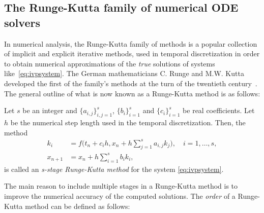 \subsection{The Runge-Kutta family of numerical ODE solvers}
\label{sub:the_runge_kutta_family_of_numerical_ode_solvers}

In numerical analysis, the Runge-Kutta family of methods is a popular collection
of implicit and explicit iterative methods, used in temporal discretization in
order to obtain numerical approximations of the \emph{true} solutions of systems
like~\eqref{eq:ivpsystem}. The German mathematicians C. Runge and M.W. Kutta
developed the first of the family's methods at the turn of the twentieth
century~\parencite[p.134]{hairer1993solving}. The general outline of what
is now known as a Runge-Kutta method is as follows:

\begin{defn}
    \label{def:runge_kutta_methods}
    Let $s$ be an integer and $\{a_{i,j}\}_{i,j=1}^{s}$, %
    $\{b_{i}\}_{i=1}^{s}$ and $\{c_{i}\}_{i=1}^{s}$ be real coefficients.\hfill\newline
    Let $h$ be the numerical step length used in the temporal discretization.\hfill\newline
    Then, the method
    \begin{equation}
        \label{eq:generalrungekutta}
        \begin{aligned}
        k_{i} &= f\bigg(t_{n} + c_{i}h, x_{n} + h\sum\limits_{j=1}^{s}a_{i,j}k_{j}\bigg), \quad{}i=1,\ldots,s,\\
        x_{n+1} &= x_{n} + h\sum\limits_{i=1}^{s}b_{i}k_{i},
        \end{aligned}
    \end{equation}
    is called an \emph{s-stage Runge-Kutta method} for the system
    \eqref{eq:ivpsystem}.
\end{defn}

The main reason to include multiple stages in a Runge-Kutta method is to
improve the numerical accuracy of the computed solutions. The \emph{order} of a
Runge-Kutta method can be defined as follows:


